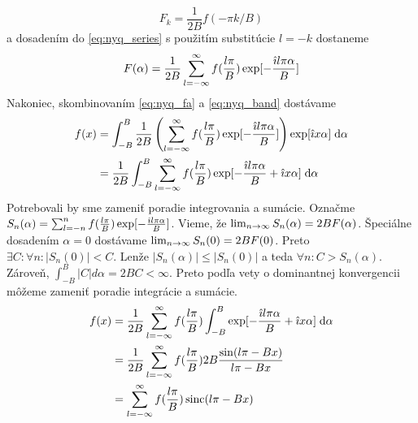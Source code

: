 \begin{dokaz}
    \begin{equation*}
        F_k = \frac{1}{2B} f(- \pi k / B)
    \end{equation*}
    a dosadením do \eqref{eq:nyq_series} s použitím substitúcie $l=-k$ dostaneme
    \begin{equation}
        F(\alpha) = \frac{1}{2B} \sum_{l=-\infty}^{\infty}
            f(\frac{l \pi}{B}) \exp[-\frac{\hat{\imath} l \pi \alpha}{B}]
        \label{eq:nyq_fa}
    \end{equation}
    Nakoniec, skombinovaním \eqref{eq:nyq_fa} a \eqref{eq:nyq_band}
    dostávame
    \begin{align*}
        f(x) & =  \int_{-B}^{B} \frac{1}{2B} \left(\sum_{l=-\infty}^{\infty} 
                f(\frac{l \pi}{B}) \exp[-\frac{\hat{\imath} l \pi \alpha}{B}]
                \right)
                \exp[ \hat{\imath} x \alpha] \; \mathrm{d}\alpha \\
            & =  \frac{1}{2B} \int_{-B}^{B} \sum_{l=-\infty}^{\infty} 
                f(\frac{l \pi}{B}) \exp[-\frac{\hat{\imath} l \pi \alpha}{B}
                + \hat{\imath} x \alpha] \; \mathrm{d}\alpha
    \end{align*}
    Potrebovali by sme zameniť poradie integrovania a sumácie.
    Označme $S_n(\alpha) = \sum_{l=-n}^{n} f(\frac{l \pi}{B})
    \exp[-\frac{\hat{\imath} l \pi \alpha}{B}]$.
    Vieme, že $\lim_{n\rightarrow \infty} S_n(\alpha) = 2 B F(\alpha)$.
    Špeciálne dosadením $\alpha=0$ dostávame
     $\lim_{n \rightarrow \infty} S_n(0) = 2 B F(0)$.
     Preto $\exists C: \forall n: |S_n(0)| < C$.
     Lenže $|S_n(\alpha)| \le |S_n(0)|$ a teda $\forall n: C >
     S_n(\alpha)$.
     Zároveň, $\int_{-B}^B |C| d\alpha = 2 B C < \infty$.
     Preto podľa vety o dominantnej konvergencii
     môžeme zameniť poradie integrácie a sumácie.     
    \begin{align*}
       f(x) & =  \frac{1}{2B}  \sum_{l=-\infty}^{\infty} 
                f(\frac{l \pi}{B}) \int_{-B}^{B} 
                \exp[-\frac{\hat{\imath} l \pi \alpha}{B}
                + \hat{\imath} x \alpha] \; \mathrm{d}\alpha \\
            & =  \frac{1}{2B} \sum_{l=-\infty}^{\infty}
                f(\frac{l \pi}{B}) 2B \frac{\sin(l \pi - B x)}{l \pi -
                B x} \\
            & =  \sum_{l=-\infty}^{\infty}
                f(\frac{l \pi}{B})  \operatorname{sinc}(l \pi - B x)
    \end{align*}
\end{dokaz}

\nocite{priestley}
